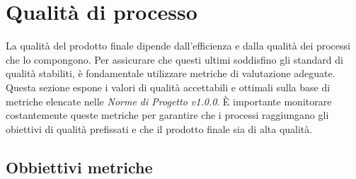 \section{Qualità di processo}
La qualità del prodotto finale dipende dall'efficienza e dalla qualità dei
processi che lo compongono. Per assicurare che questi ultimi soddisfino gli
standard di qualità stabiliti, è fondamentale utilizzare metriche di valutazione
adeguate. Questa sezione espone i valori di qualità accettabili e ottimali
sulla base di metriche elencate nelle \textit{Norme di Progetto v1.0.0}. È importante monitorare costantemente queste
metriche per garantire che i processi raggiungano gli obiettivi di qualità
prefissati e che il prodotto finale sia di alta qualità.

\subsection{Obbiettivi metriche}
